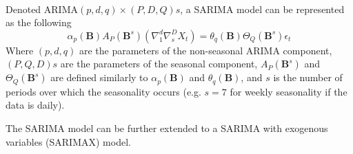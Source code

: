 \\
Denoted ARIMA$(p,d,q)\times(P,D,Q)s$, a SARIMA model can be represented as the following
\begin{equation}
\alpha_{p}(\textbf{B})A_{P}(\textbf{B}^{s})(\nabla_{1}^{d}\nabla_{s}^{D}X_{t}) = \theta_{q}(\textbf{B})\Theta_{Q}(\textbf{B}^{s})\epsilon_{t}
\end{equation}
Where $(p,d,q)$ are the parameters of the non-seasonal ARIMA component, $(P,Q,D)s$ are the parameters of the seasonal component, $A_{P}(\textbf{B}^{s})$ and $\Theta_{Q}(\textbf{B}^{s})$ are defined similarly to $\alpha_{p}(\textbf{B})$ and $\theta_{q}(\textbf{B})$, and $s$ is the number of periods over which the seasonality occurs (e.g. $s=7$ for weekly seasonality if the data is daily).
\par
The SARIMA model can be further extended to a SARIMA with exogenous variables (SARIMAX) model. 

